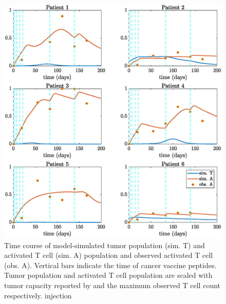 \documentclass[review,authoryear]{elsarticle}
\begin{document}
\begin{figure}[h]
\centerline{\includegraphics[width=0.7\paperwidth]{figs/pat1-6fitting}}\caption{Time course of model-simulated tumor population (sim. T) and activated T cell (sim. A) population and observed activated T cell (obs. A). Vertical bars indicate the time of cancer vaccine peptides. Tumor population and activated T cell population are scaled with tumor capacity reported by \citet{Messan2021} and the maximum observed T cell count respectively.  
injection\label{fig:data-fitting.}}

\end{figure}

%
%
%
\end{document}
